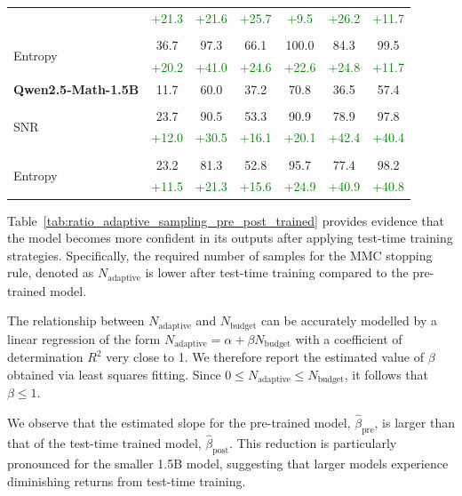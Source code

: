 \begin{table}[ht!]
\begin{center}
\begin{tabular}{lcccccc}
&\textcolor{green}{+21.3} & \textcolor{green}{+21.6} &\textcolor{green}{+25.7}& \textcolor{green}{+9.5}&\textcolor{green}{+26.2} & \textcolor{green}{+11.7} \\
 \\
\multirow{2}{*}{Entropy}   &36.7& 97.3 & 66.1& 100.0&84.3 & 99.5\\
&\textcolor{green}{+20.2} & \textcolor{green}{+41.0}  &\textcolor{green}{+24.6} & \textcolor{green}{+22.6} &\textcolor{green}{+24.8} & \textcolor{green}{+11.7} \\
\midrule
\textbf{Qwen2.5-Math-1.5B} &11.7& 60.0 &37.2&  70.8 &36.5 & 57.4\\
\\
\multirow{2}{*}{SNR}  &23.7 & 90.5 &53.3&  90.9&78.9 & 97.8\\
& \textcolor{green}{+12.0} &\textcolor{green}{+30.5} & \textcolor{green}{+16.1}&   \textcolor{green}{+20.1}&\textcolor{green}{+42.4}& \textcolor{green}{+40.4}\\
 \\
\multirow{2}{*}{Entropy}  &23.2  &  81.3 &52.8& 95.7 &77.4 & 98.2\\
 &\textcolor{green}{+11.5} & \textcolor{green}{+21.3} &\textcolor{green}{+15.6}&   \textcolor{green}{+24.9} &\textcolor{green}{+40.9} & \textcolor{green}{+40.8}\\
\bottomrule
\end{tabular}
\end{center}
\end{table}
\normalsize

Table~\ref{tab:ratio_adaptive_sampling_pre_post_trained} provides evidence that the model becomes more confident in its outputs after applying test-time training strategies.
Specifically, the required number of samples for the MMC stopping rule, denoted as $N_{\text{adaptive}}$ is lower after test-time training compared to the pre-trained model.

The relationship between $N_{\text{adaptive}}$ and $N_{\text{budget}}$ can be accurately modelled by a linear regression of the form $N_{\text{adaptive}} = \alpha + \beta N_{\text{budget}}$ with a coefficient of determination $R^2$ very close to 1. We therefore report the estimated value of $\beta$ obtained via least squares fitting.
Since $0\leq N_{\text{adaptive}}\leq N_{\text{budget}}$, it follows that $\beta\leq1$. 

We observe that the estimated slope for the pre-trained model, $\hat\beta_{\text{pre}}$, is larger than that of the test-time trained model, $\hat\beta_{\text{post}}$. This reduction is particularly pronounced for the smaller 1.5B model, suggesting that larger models experience diminishing returns from test-time training.


